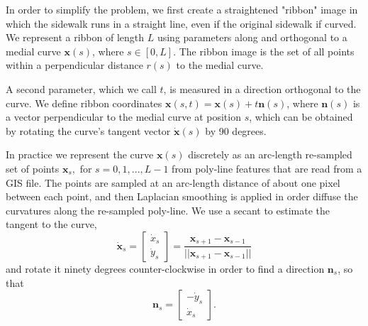 In order to simplify the problem, we first create a straightened "ribbon" image in which the sidewalk runs in a straight line, even if the original sidewalk if curved.
We represent a ribbon of length $L$ using parameters along and orthogonal to a medial curve $\mathbf{x}(s)$, where $s \in [0, L]$. The ribbon image is the set of all points within a perpendicular distance $r(s)$ to the medial curve.

A second parameter, which we call $t$, is measured in a direction orthogonal to the curve.  
We define ribbon coordinates $\mathbf{x}(s, t) = \mathbf{x}(s) + t\mathbf{n}(s)$, where $\mathbf{n}(s)$ is a vector perpendicular to the medial curve at position $s$, which can be obtained by rotating the curve's tangent vector $\dot{\mathbf{x}}(s)$ by 90 degrees. 


In practice we represent the curve $\mathbf{x}(s)$ discretely as an arc-length re-sampled set of points $\mathbf{x}_s,$ for $s=0,1,...,L-1$ from poly-line features that are read from a GIS file. The points are sampled at an arc-length distance of about one pixel between each point, and then Laplacian smoothing is applied in order diffuse the curvatures along the re-sampled poly-line.  
We use a secant to estimate the tangent to the curve,
\[\dot{\mathbf{x}}_s = \left[\begin{array}{c} \dot{x}_s \\ \dot{y}_s \end{array}\right]= \frac{\mathbf{x}_{s+1}-\mathbf{x}_{s-1}}{||\mathbf{x}_{s+1}-\mathbf{x}_{s-1}||} \] and rotate it ninety degrees counter-clockwise in order to find a direction  $\mathbf{n}_s$, so that 
\[\mathbf{n}_s = \left[\begin{array}{c} -\dot{y}_s \\ \dot{x}_s \end{array}\right]. \]

